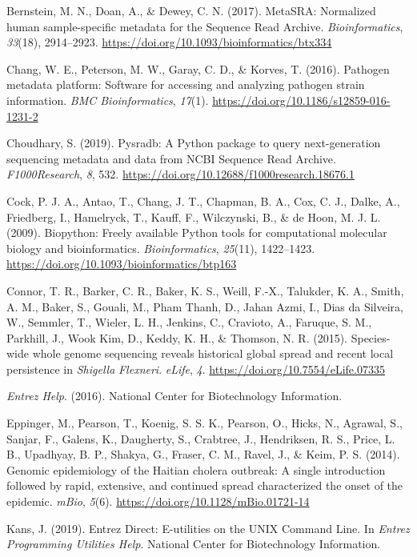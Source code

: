 \documentclass[
]{article}
\begin{document}
Bernstein, M. N., Doan, A., \& Dewey, C. N. (2017). MetaSRA: Normalized
human sample-specific metadata for the Sequence Read Archive.
\emph{Bioinformatics}, \emph{33}(18), 2914--2923.
\url{https://doi.org/10.1093/bioinformatics/btx334}

Chang, W. E., Peterson, M. W., Garay, C. D., \& Korves, T. (2016).
Pathogen metadata platform: Software for accessing and analyzing
pathogen strain information. \emph{BMC Bioinformatics}, \emph{17}(1).
\url{https://doi.org/10.1186/s12859-016-1231-2}

Choudhary, S. (2019). Pysradb: A Python package to query next-generation
sequencing metadata and data from NCBI Sequence Read Archive.
\emph{F1000Research}, \emph{8}, 532.
\url{https://doi.org/10.12688/f1000research.18676.1}

Cock, P. J. A., Antao, T., Chang, J. T., Chapman, B. A., Cox, C. J.,
Dalke, A., Friedberg, I., Hamelryck, T., Kauff, F., Wilczynski, B., \&
de Hoon, M. J. L. (2009). Biopython: Freely available Python tools for
computational molecular biology and bioinformatics.
\emph{Bioinformatics}, \emph{25}(11), 1422--1423.
\url{https://doi.org/10.1093/bioinformatics/btp163}

Connor, T. R., Barker, C. R., Baker, K. S., Weill, F.-X., Talukder, K.
A., Smith, A. M., Baker, S., Gouali, M., Pham Thanh, D., Jahan Azmi, I.,
Dias da Silveira, W., Semmler, T., Wieler, L. H., Jenkins, C., Cravioto,
A., Faruque, S. M., Parkhill, J., Wook Kim, D., Keddy, K. H., \&
Thomson, N. R. (2015). Species-wide whole genome sequencing reveals
historical global spread and recent local persistence in \emph{Shigella}
\emph{Flexneri}. \emph{eLife}, \emph{4}.
\url{https://doi.org/10.7554/eLife.07335}

\emph{Entrez Help}. (2016). National Center for Biotechnology
Information.

Eppinger, M., Pearson, T., Koenig, S. S. K., Pearson, O., Hicks, N.,
Agrawal, S., Sanjar, F., Galens, K., Daugherty, S., Crabtree, J.,
Hendriksen, R. S., Price, L. B., Upadhyay, B. P., Shakya, G., Fraser, C.
M., Ravel, J., \& Keim, P. S. (2014). Genomic epidemiology of the
Haitian cholera outbreak: A single introduction followed by rapid,
extensive, and continued spread characterized the onset of the epidemic.
\emph{mBio}, \emph{5}(6). \url{https://doi.org/10.1128/mBio.01721-14}

Kans, J. (2019). Entrez Direct: E-utilities on the UNIX Command Line. In
\emph{Entrez Programming Utilities Help}. National Center for
Biotechnology Information.
\end{document}
